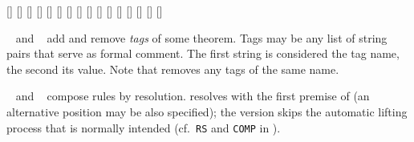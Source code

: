 \begin{isabellebody}
\begin{isamarkuptext}
  \begin{railoutput}
[]
[]
[]
\rail@end
{}
[]
[]
\rail@end
{}
\rail@bar
{}[]
[]
\rail@endbar
\rail@bar
{}
[]
[]
[]
\rail@endbar
{}[]
\rail@end
{}
\rail@bar
{}[]
[]
\rail@endbar
{}[]
\rail@end
{}
[]
\rail@bar
{}
[]
\rail@endbar
\rail@end
\end{railoutput}


  \begin{description}

  \item \hyperlink{attribute.tagged}{\mbox{}}~ and \hyperlink{attribute.untagged}{\mbox{}}~ add and remove \emph{tags} of some theorem.
  Tags may be any list of string pairs that serve as formal comment.
  The first string is considered the tag name, the second its value.
  Note that \hyperlink{attribute.untagged}{\mbox{}} removes any tags of the same name.

  \item \hyperlink{attribute.THEN}{\mbox{}}~ and \hyperlink{attribute.COMP}{\mbox{}}~
  compose rules by resolution.  \hyperlink{attribute.THEN}{\mbox{}} resolves with the
  first premise of  (an alternative position may be also
  specified); the \hyperlink{attribute.COMP}{\mbox{}} version skips the automatic
  lifting process that is normally intended (cf.\ \verb|RS| and
  \verb|COMP| in \cite{isabelle-implementation}).
  

\end{description}
\end{isamarkuptext}
\end{isabellebody}
